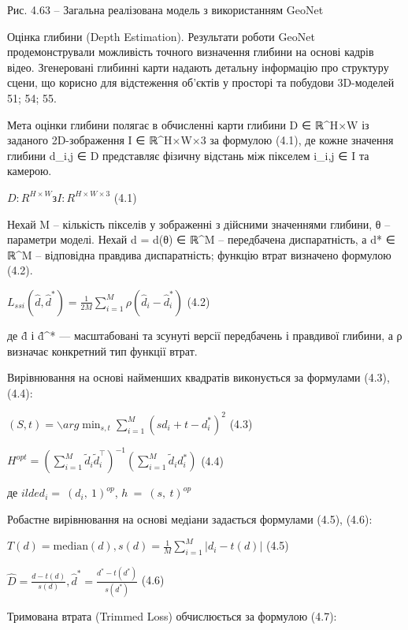 \documentclass[
]{article}
\begin{document}
\protect{}\label{_Ref221383821}{}Рис. 4.63 -- Загальна реалізована модель з використанням GeoNet

Оцінка глибини (Depth Estimation). Результати роботи GeoNet продемонстрували можливість точного визначення глибини на основі кадрів відео. Згенеровані глибинні карти надають детальну інформацію про структуру сцени, що корисно для відстеження об'єктів у просторі та побудови 3D-моделей 51; 54; 55.

Мета оцінки глибини полягає в обчисленні карти глибини D ∈ ℝ\^{}H×W із заданого 2D-зображення I ∈ ℝ\^{}H×W×3 за формулою (4.1), де кожне значення глибини d\_i,j ∈ D представляє фізичну відстань між пікселем i\_i,j ∈ I та камерою.

\(D:R^{H \times W}\text{з}I:R^{H \times W \times 3}\) (4.1)

Нехай M -- кількість пікселів у зображенні з дійсними значеннями глибини, θ -- параметри моделі. Нехай d = d(θ) ∈ ℝ\^{}M -- передбачена диспаратність, а d* ∈ ℝ\^{}M -- відповідна правдива диспаратність; функцію втрат визначено формулою (4.2).

\(L_{ssi}\left( \widehat{d},{\widehat{d}}^{*} \right) = \frac{1}{2M}\sum_{i = 1}^{M}{\rho\left( {\widehat{d}}_{i} - {\widehat{d}}_{i}^{*} \right)}\) (4.2)

де d̂ і d̂\^{}* --- масштабовані та зсунуті версії передбачень і правдивої глибини, а ρ визначає конкретний тип функції втрат.

Вирівнювання на основі найменших квадратів виконується за формулами (4.3), (4.4):

\((S,t) = \backslash arg\min_{s,t}\sum_{i = 1}^{M}{(sd_{i} + t - d_{i}^{*})^{2}}\) (4.3)

\(H^{opt} = \left( {\sum_{i = 1}^{M}{{\widetilde{d}}_{i}{\widetilde{d}}_{i}^{\top}}} \right)^{- 1}\left( {\sum_{i = 1}^{M}{{\widetilde{d}}_{i}d_{i}^{*}}} \right)\) (4.4)

де \(ilded_{i} = \ \left( d_{i},\ 1 \right)^{op}\), \(h\  = \ (s,\ t)^{op}\)

Робастне вирівнювання на основі медіани задається формулами (4.5), (4.6):

\(T(d) = \text{median}(d),s(d) = \frac{1}{M}\sum_{i = 1}^{M}\left| d_{i} - t(d) \right|\) (4.5)

\(\widehat{D} = \frac{d - t(d)}{s(d)},{\widehat{d}}^{*} = \frac{d^{*} - t\left( d^{*} \right)}{s\left( d^{*} \right)}\) (4.6)

Тримована втрата (Trimmed Loss) обчислюється за формулою (4.7):
\end{document}
